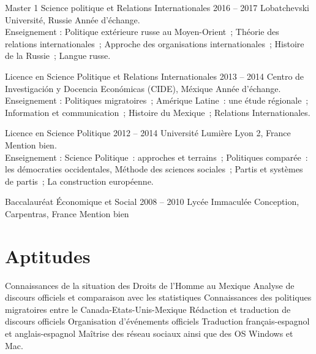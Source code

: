 \documentclass[30pt, french]{tccv}
\begin{document}
\begin{upshape}
\begin{education}
\item[Master 1 Science politique et Relations Internationales]{2016 -- 2017}
     {Lobatchevski Université, Russie}
     {     
     Année d’échange.\\
     \sloppy
     Enseignement : Politique extérieure russe au Moyen-Orient ; 
     Théorie des relations internationales ; 
     Approche des organisations internationales ; 
     Histoire de la Russie ; 
     Langue russe.
     }
    
\item[Licence en Science Politique et Relations Internationales]{2013 -- 2014}
     {Centro de Investigación y Docencia Económicas (CIDE), Méxique}
     {Année d’échange.\\
     Enseignement : Politiques migratoires ; Amérique Latine : une étude régionale ; Information et communication ; Histoire du Mexique ; Relations Internationales.
     }

\item[Licence en Science Politique ]{2012 -- 2014}
     {Université Lumière Lyon 2, France}
     {Mention bien.\\
     Enseignement : Science Politique : approches et terrains ; Politiques comparée : les démocraties occidentales, Méthode des sciences sociales ; Partis et systèmes de partis ; La construction européenne. 
     }


\item[Baccalauréat Économique et Social]{2008 -- 2010}
     {Lycée Immaculée Conception, Carpentras, France}
     {Mention bien}
     
\vspace{-0.5cm}     
\section{Aptitudes}
\setlength{\parskip}{0pt}
\begin{itemize}[leftmargin=13pt]
  \setlength\itemsep{-3pt} 
  \fontsize{10pt}{1.1em}\color{text}\selectfont
  \cvitem[\checkmark]  Connaissances de la situation des Droits de l’Homme au Mexique
  \cvitem[\checkmark]  Analyse de discours officiels et comparaison avec les statistiques
  \cvitem[\checkmark]  Connaissances des politiques migratoires entre le Canada-Etats-Unis-Mexique
  \cvitem[\checkmark]  Rédaction et traduction de discours officiels
  \cvitem[\checkmark]  Organisation d’événements officiels
  \cvitem[\checkmark]  Traduction français-espagnol et anglais-espagnol
  \cvitem[\checkmark]  Maîtrise des réseau sociaux ainsi que des OS Windows et Mac. 
\end{itemize}




\end{education}
\end{upshape}
\end{document}
